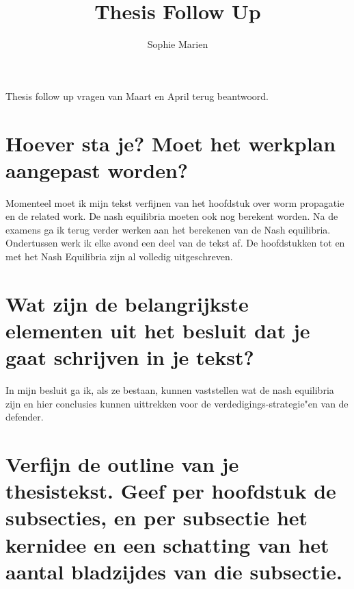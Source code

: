 \documentclass[a4paper, 11pt]{article}
\begin{document}
\begin{titlepage}
\title{Thesis Follow Up}
\author{Sophie Marien}
\date{} 
\end{titlepage}



\maketitle


Thesis follow up vragen van Maart en April terug beantwoord. 
\section{Hoever sta je? Moet het werkplan aangepast worden?}
 Momenteel moet ik mijn tekst verfijnen van het hoofdstuk over worm propagatie en de related work. De nash equilibria moeten ook nog berekent worden. Na de examens ga ik terug verder werken aan het berekenen van de Nash equilibria. Ondertussen werk ik elke avond een deel van de tekst af. De hoofdstukken tot en met het Nash Equilibria zijn al volledig uitgeschreven. 
\section{Wat zijn de belangrijkste elementen uit het besluit dat je gaat schrijven in je tekst?}
In mijn besluit ga ik, als ze bestaan, kunnen vaststellen wat de nash equilibria zijn en hier conclusies kunnen uittrekken voor de verdedigings-strategie"en van de defender. 
\section{Verfijn de outline van je thesistekst. Geef per hoofdstuk de subsecties, en per subsectie het kernidee en een schatting van het aantal bladzijdes van die subsectie.}
\end{document}
